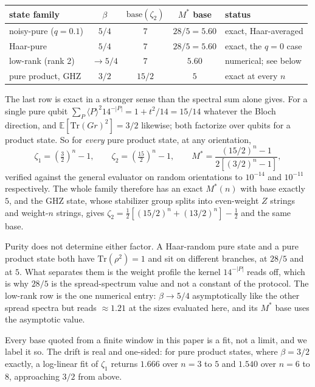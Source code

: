 \documentclass[a4paper,superscriptaddress,nofootinbib,onecolumn,nopdfoutputerror]{quantumarticle}
\begin{document}
\begin{center}
\begin{tabular}{lcccl}
\hline
state family & \(\beta\) & \(\mathrm{base}(\zeta_2)\) & \(M^*\) base & status \\
\hline
noisy-pure (\(q=0.1\)) & \(5/4\) & \(7\)    & \(28/5 = 5.60\) & exact, Haar-averaged \\
Haar-pure              & \(5/4\) & \(7\)    & \(28/5 = 5.60\) & exact, the \(q = 0\) case \\
low-rank (rank 2)      & \(\to 5/4\) & \(7\) & \(5.60\)        & numerical; see below \\
pure product, GHZ      & \(3/2\) & \(15/2\) & \(5\)           & exact at every \(n\) \\
\hline
\end{tabular}
\end{center}

\noindent
The last row is exact in a stronger sense than the spectral sum alone gives. For a single pure
qubit \(\sum_{P} \langle P\rangle^2 14^{-|P|} = 1 + t^2/14 = 15/14\) whatever the Bloch
direction, and \(\mathbb{E}[\mathrm{Tr}(Gr)^2] = 3/2\) likewise; both factorize over qubits for
a product state. So for \emph{every} pure product state, at any orientation,
\[
\zeta_1 = \left(\tfrac{3}{2}\right)^{\! n} \!- 1, \qquad
\zeta_2 = \left(\tfrac{15}{2}\right)^{\! n} \!- 1, \qquad
M^* = \frac{(15/2)^n - 1}{2\left[(3/2)^n - 1\right]},
\]
verified against the general evaluator on random orientations to \(10^{-14}\) and \(10^{-11}\)
respectively. The whole family therefore has an exact \(M^*(n)\) with base exactly \(5\), and
the GHZ state, whose stabilizer group splits into even-weight \(Z\) strings and weight-\(n\)
strings, gives \(\zeta_2 = \tfrac12[(15/2)^n + (13/2)^n] - \tfrac12\) and the same base.

Purity does not determine either factor. A Haar-random pure state and a pure product state both
have \(\mathrm{Tr}(\rho^2) = 1\) and sit on different branches, at \(28/5\) and at \(5\). What
separates them is the weight profile the kernel \(14^{-|P|}\) reads off, which is why \(28/5\)
is the spread-spectrum value and not a constant of the protocol. The low-rank row is the one
numerical entry: \(\beta \to 5/4\) asymptotically like the other spread spectra but reads
\(\approx 1.21\) at the sizes evaluated here, and its \(M^*\) base uses the asymptotic value.

Every base quoted from a finite window in this paper is a fit, not a limit, and we label it so.
The drift is real and one-sided: for pure product states, where \(\beta = 3/2\) exactly, a
log-linear fit of \(\zeta_1\) returns \(1.666\) over \(n = 3\) to \(5\) and \(1.540\) over
\(n = 6\) to \(8\), approaching \(3/2\) from above.
\end{document}

